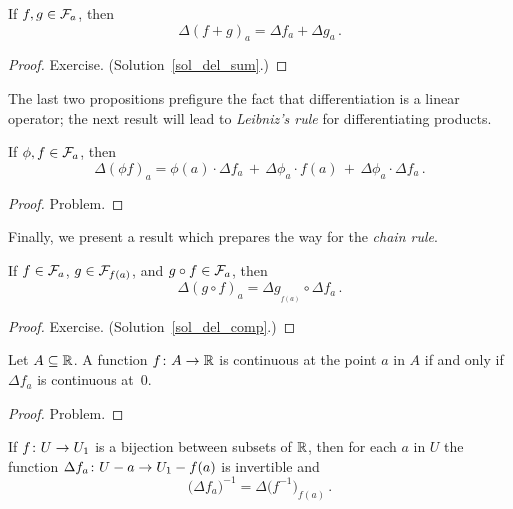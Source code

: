 \begin{prop}\label{del_sum} If $f,g \in \mathcal{F}_a$, then
   \[ \Delta(f+g)_a = \Delta f_a + \Delta g_a\,. \]
\end{prop}

\begin{proof} Exercise.   (Solution~\ref{sol_del_sum}.)  \ns \end{proof}

The last two propositions prefigure the fact that differentiation is a linear operator; the
next result will lead to \emph{Leibniz's rule} for differentiating products.

\begin{prop}\label{del_mult} If $\phi, f \in \mathcal{F}_a$, then
  \[\Delta(\phi f)_a = \phi(a)\cdot\Delta f_a \,+\, \Delta\phi_a\cdot f(a)
                        \,+\, \Delta\phi_a\cdot\Delta f_a\,. \]
\end{prop}

\begin{proof} Problem. \ns \end{proof}

Finally, we present a result which prepares the way for the \emph{chain rule}.

\begin{prop}\label{del_comp} If $f \in \mathcal{F}_a$, $g \in \mathcal{F}_{f(a)}$, and
$g \circ f \in \mathcal{F}_a$, then
   \[ \Delta(g \circ f)_a = \Delta g_{{}_{\scriptstyle{f(a)}}} \circ \Delta f_a\,. \]
\end{prop}

\begin{proof} Exercise.  (Solution~\ref{sol_del_comp}.)   \ns \end{proof}

\begin{prop} Let $A \subseteq \mathbb{R}$.  A function $f \colon A \rightarrow \mathbb{R}$ is continuous at the
point $a$ in $A$ if and only if $\Delta f_a$ is continuous at~$0$.
\end{prop}

\begin{proof} Problem. \ns  \end{proof}

\begin{prop} If $f \colon U \rightarrow U_1$ is a bijection between subsets of $\mathbb{R}$, then for each
$a$ in $U$ the function $\Delta f_a \colon  U - a \rightarrow U_1 - f(a)$ is invertible and
   \[ \bigl(\Delta f_a\bigr)^{-1}=\Delta\bigl(f^{-1}\bigr)_{f(a)}\,. \]
\end{prop}

